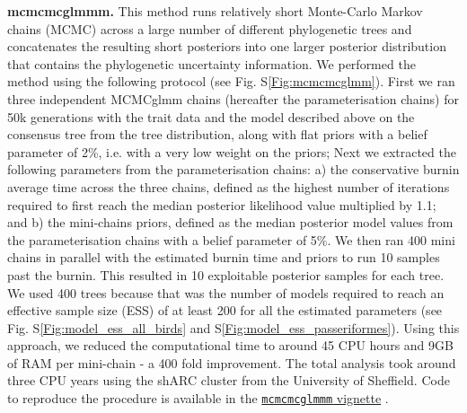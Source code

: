 \documentclass[12pt,letterpaper]{article}
\begin{document}
\textbf{mcmcmcglmmm.}
This method runs relatively short Monte-Carlo Markov chains (MCMC) across a large number of different phylogenetic trees and concatenates the resulting short posteriors into one larger posterior distribution that contains the phylogenetic uncertainty information.
We performed the method using the following protocol (see Fig. S\ref{Fig:mcmcmcglmm}).
First we ran three independent MCMCglmm chains (hereafter the parameterisation chains) for 50k generations with the trait data and the model described above on the consensus tree from the tree distribution, along with flat priors with a belief parameter of 2\%, i.e. with a very low weight on the priors;
Next we extracted the following parameters from the parameterisation chains:
a) the conservative burnin average time across the three chains, defined as the highest number of iterations required to first reach the median posterior likelihood value multiplied by 1.1; and
b) the mini-chains priors, defined as the median posterior model values from the parameterisation chains with a belief parameter of 5\%.
We then ran 400 mini chains in parallel with the estimated burnin time and priors to run 10 samples past the burnin.
This resulted in 10 exploitable posterior samples for each tree.
We used 400 trees because that was the number of models required to reach an effective sample size (ESS) of at least 200 for all the estimated parameters (see Fig. S\ref{Fig:model_ess_all_birds} and S\ref{Fig:model_ess_passeriformes}).
Using this approach, we reduced the computational time to around 45 CPU hours and 9GB of RAM per mini-chain - a 400 fold improvement.
The total analysis took around three CPU years using the shARC cluster from the University of Sheffield.
Code to reproduce the procedure is available in the \href{https://raw.rawgit.net/TGuillerme/mcmcmcglmmm/main/inst/MCMCglmm_mini_chains.html}{\texttt{mcmcmcglmmm} vignette} \cite{mcmcmcglmmm}.
\end{document}
